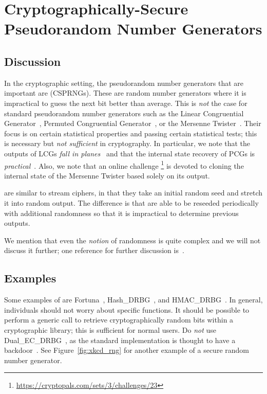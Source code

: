 \section{Cryptographically-Secure Pseudorandom Number Generators}
\label{sec:csprng}

\subsection{Discussion}

In the cryptographic setting, the pseudorandom number generators
that are important are
\emph{}
(CSPRNGs).
These are random number generators where it is impractical
to guess the next bit better than average.
This is \emph{not} the case for standard pseudorandom number generators
such as the Linear Congruential Generator~\cite[Chapter 3.2.1]{TAOCP2},
Permuted Congruential Generator~\cite{PCG2014},
or the Mersenne Twister~\cite{matsumoto1998mersenne}.
Their focus is on certain statistical properties and passing
certain statistical tests;
this is necessary but \emph{not sufficient} in cryptography.
In particular, we note that the outputs of LCGs
\emph{fall in planes}~\cite{marsaglia1968random}
and that the internal state recovery of PCGs
is \emph{practical}~\cite{bouillaguet2020practical}.
Also, we note that an online challenge%
\footnote{\url{https://cryptopals.com/sets/3/challenges/23}}
is devoted to cloning the internal state of the Mersenne Twister
based solely on its output.

 are similar to \glspl{stream cipher}, in that they take
an initial random seed and stretch it into random output.
The difference is that  are able to be reseeded
periodically with additional randomness
so that it is impractical to determine previous outputs.

We mention that even the \emph{notion} of randomness is quite complex
and we will not discuss it further;
one reference for further discussion is~\cite[Chapter 3.5]{TAOCP2}.

\subsection{Examples}

Some examples of  are
Fortuna~\cite[Chapter 10]{PracticalCryptography}\cite[Chapter 9]{CryptoEng},
Hash\_DRBG~\cite[Section~10.1.1]{NIST-SP-800-90ARev1},
and HMAC\_DRBG~\cite[Section~10.1.2]{NIST-SP-800-90ARev1}.
In general, individuals should not worry about specific
 functions.
It should be possible to perform a generic call to retrieve
cryptographically random bits within a cryptographic library;
this is sufficient for normal users.
Do \emph{not} use Dual\_EC\_DRBG~\cite[Section~10.3.1]{NIST-SP-800-90A},
as the standard implementation
is thought to have a backdoor~\cite{BernsteinDualEC}.
See Figure~\ref{fig:xkcd_rng} for another example of a
secure random number generator.

